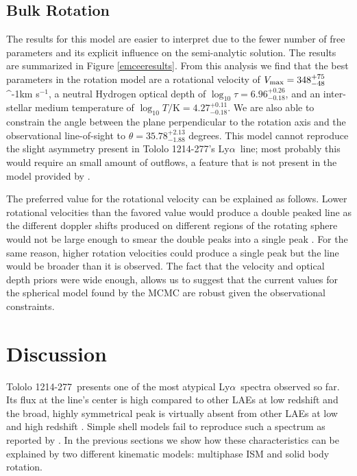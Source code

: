 \documentclass[a4,useAMS,usenatbib,usegraphicx]{mn2e}
\newcommand{\tol}{Tololo 1214-277}
\newcommand{\lya}{\ifmmode{{\rm Ly}\alpha}\else Ly$\alpha$\ \fi}
\newcommand{\kms}{\ifmmode\mathrm{km\ s}^{-1}\else km s$^{-1}$\fi}
\begin{document}
\subsection{Bulk Rotation}

The results for this model are easier to interpret due to the fewer
number of free parameters and its explicit influence on the
semi-analytic solution.
The results are summarized in  Figure \ref{emceeresults}. 
From this analysis we find that the best parameters in the rotation
model are a rotational velocity of  $V_{\rm max}=348^{+75}_{-48}$
\kms, a neutral Hydrogen optical depth of
$\log_{10}\tau=6.96^{+0.26}_{-0.18}$,  and an inter-stellar medium
temperature of $\log_{10} T/\mathrm {K} = 4.27^{+0.11}_{-0.18}$.   
We are also able to constrain the angle between the plane
perpendicular to the rotation axis and the observational line-of-sight
to $\theta = 35.78^{+2.13}_{-1.88}$ degrees.
This model cannot reproduce the slight asymmetry present in \tol's
\lya line; most probably this would require an small amount of
outflows, a feature that is not present in the model provided by
\cite{GaravitoCamargo2014}. 

The preferred value for the rotational velocity can be explained as
follows. 
Lower rotational velocities than the favored value would produce a
double peaked line as the different doppler shifts produced on
different regions of the rotating sphere would not be large enough to
smear the double peaks into a single peak
\citep{GaravitoCamargo2014}. 
For the same reason, higher rotation velocities could produce a single
peak but the line would be broader than it is observed.
The fact that the velocity and optical depth priors were wide enough,
allows us to suggest that the current values for the spherical model
found by the MCMC are robust given the observational constraints.






\section{Discussion}

\tol\ presents one of the most atypical \lya spectra observed so far.
Its flux at the line's center is high compared to other LAEs at low
redshift and the broad, highly symmetrical peak is virtually absent from other
LAEs at low and high redshift
\citep{2012ApJ...751...29Y,LARS,Erb14,Trainor16}. 
Simple shell models
fail to reproduce such a spectrum as reported by \cite{2015A&A...578A...7V}.  
In the previous sections we show how these characteristics can be
explained by two different kinematic models: multiphase ISM and solid
body rotation.
\end{document}
